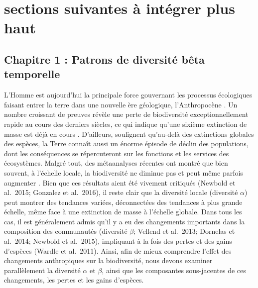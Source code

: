 \hypertarget{sections-suivantes-uxe0-intuxe9grer-plus-haut}{%
\section{sections suivantes à intégrer plus
haut}\label{sections-suivantes-uxe0-intuxe9grer-plus-haut}}

\hypertarget{chapitre-1-patrons-de-diversituxe9-buxeata-temporelle}{%
\subsection{Chapitre 1 : Patrons de diversité bêta
temporelle}\label{chapitre-1-patrons-de-diversituxe9-buxeata-temporelle}}

L'Homme est aujourd'hui la principale force gouvernant les processus
écologiques faisant entrer la terre dans une nouvelle ère géologique,
l'Anthropocène \citep{crutzen_geology_2002}. Un nombre croissant de
preuves révèle une perte de biodiversité exceptionnellement rapide au
cours des derniers siècles, ce qui indique qu'une sixième extinction de
masse est déjà en cours \citep{ceballos_accelerated_2015}. D'ailleurs,
\citet{ceballos_accelerated_2015} soulignent qu'au-delà des extinctions
globales des espèces, la Terre connaît aussi un énorme épisode de déclin
des populations, dont les conséquences se répercuteront sur les
fonctions et les services des écosystèmes. Malgré tout, des métaanalyses
récentes ont montré que bien souvent, à l'échelle locale, la
biodiversité ne diminue pas et peut même parfois augmenter
\citep{vellend_global_2013, dornelas_assemblage_2014}. Bien que ces
résultats aient été vivement critiqués (Newbold et al.~2015; Gonzalez et
al.~2016), il reste clair que la diversité locale (diversité \(\alpha\))
peut montrer des tendances variées, déconnectées des tendances à plus
grande échelle, même face à une extinction de masse à l'échelle globale.
Dans tous les cas, il est généralement admis qu'il y a eu des
changements importants dans la composition des communautés (diversité
\(\beta\); Vellend et al.~2013; Dornelas et al.~2014; Newbold et
al.~2015), impliquant à la fois des pertes et des gains d'espèces
(Wardle et al.~2011). Ainsi, afin de mieux comprendre l'effet des
changements anthropiques sur la biodiversité, nous devons examiner
parallèlement la diversité \(\alpha\) et \(\beta\), ainsi que les
composantes sous-jacentes de ces changements, les pertes et les gains
d'espèces.

